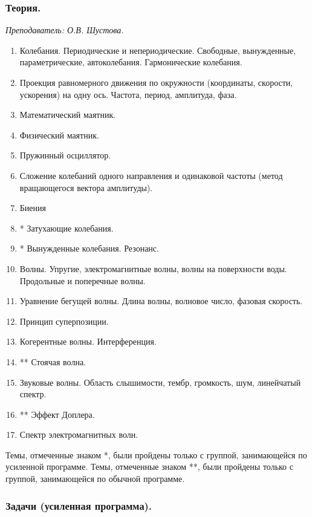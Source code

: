 \documentclass[12pt]{article}
\newlength{\h}
\newlength{\x}
\begin{document}
\subsubsection{Теория.}
\label{sec:daily10th}

\textit{Преподаватель: О.В. Шустова.}\\

\begin{enumerate}
\item Колебания. Периодические и непериодические. Свободные,
  вынужденные, параметрические, автоколебания. Гармонические
  колебания.
\item Проекция равномерного движения по окружности (координаты,
  скорости, ускорения) на одну ось. Частота, период, амплитуда, фаза.
\item Математический маятник.
\item Физический маятник.
\item Пружинный осциллятор.
\item Сложение колебаний одного направления и одинаковой частоты
  (метод вращающегося вектора амплитуды).
\item Биения
\item * Затухающие колебания.
\item * Вынужденные колебания. Резонанс.
\item Волны. Упругие, электромагнитные волны, волны на поверхности
  воды. Продольные и поперечные волны.
\item Уравнение бегущей волны. Длина волны, волновое число, фазовая скорость.
\item Принцип суперпозиции.
\item Когерентные волны. Интерференция.
\item ** Стоячая волна.
\item Звуковые волны. Область слышимости, тембр, громкость, шум, линейчатый спектр.
\item **  Эффект Доплера.
\item Спектр электромагнитных волн. 
\end{enumerate}

Темы, отмеченные знаком *, были пройдены только с группой,
занимающейся по усиленной программе. Темы, отмеченные знаком **, были
пройдены только с группой, занимающейся по обычной программе. 

\subsubsection{Задачи (усиленная программа).}
\label{sec:daily10pr-hard}
\end{document}

